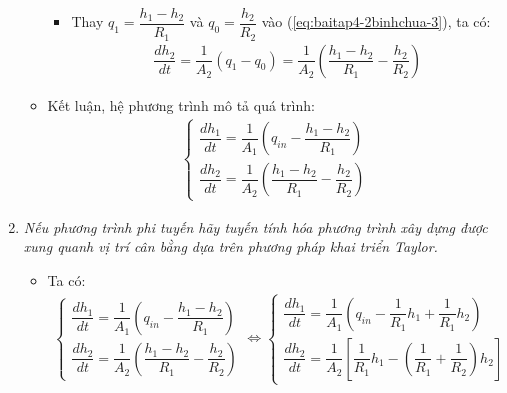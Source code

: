 \begin{enumerate}[\it a.]
\begin{itemize}
\begin{itemize}
                        \item Thay $q_1 = \dfrac{h_1 - h_2}{R_1}$ và $q_0 = \dfrac{h_2}{R_2}$ vào (\ref{eq:baitap4-2binhchua-3}), ta có:
                            \begin{align}
                                \dfrac{dh_2}{dt} = \dfrac{1}{A_2} \left({q_1 - q_0}\right) = \dfrac{1}{A_2} \left({\dfrac{h_1 - h_2}{R_1} - \dfrac{h_2}{R_2}}\right)
                            \end{align}
                    \end{itemize}

                \item Kết luận, hệ phương trình mô tả quá trình:
                    \begin{align}
                        \left\{
                        \begin{array}{l}
                            \dfrac{dh_1}{dt} = \dfrac{1}{A_1} \left({q_{in} - \dfrac{h_1 - h_2}{R_1}}\right)\\ [.5cm]
                            \dfrac{dh_2}{dt} = \dfrac{1}{A_2} \left({\dfrac{h_1 - h_2}{R_1} - \dfrac{h_2}{R_2}}\right)
                        \end{array}
                        \right.
                    \end{align}
            \end{itemize}

        \item \textit{Nếu phương trình phi tuyến hãy tuyến tính hóa phương trình xây dựng được xung quanh vị trí cân bằng dựa trên phương pháp khai triển Taylor.}
            \begin{itemize}
                \item Ta có:
                    \begin{align}\label{eq:baitap4-2binhchua-4}
                        \left\{
                        \begin{array}{l}
                            \dfrac{dh_1}{dt} = \dfrac{1}{A_1} \left({q_{in} - \dfrac{h_1 - h_2}{R_1}}\right)\\ [.5cm]
                            \dfrac{dh_2}{dt} = \dfrac{1}{A_2} \left({\dfrac{h_1 - h_2}{R_1} - \dfrac{h_2}{R_2}}\right)
                        \end{array}
                        \right.
                        \Longleftrightarrow
                        \left\{
                        \begin{array}{l}
                            \dfrac{dh_1}{dt} = \dfrac{1}{A_1} \left({q_{in} - \dfrac{1}{R_1} h_1 + \dfrac{1}{R_1} h_2}\right)\\ [.5cm]
                            \dfrac{dh_2}{dt} = \dfrac{1}{A_2} \left[{\dfrac{1}{R_1} h_1 - \left({\dfrac{1}{R_1} + \dfrac{1}{R_2}}\right) h_2}\right]
                        \end{array}
                        \right.
                    \end{align}


\end{itemize}
\end{enumerate}
